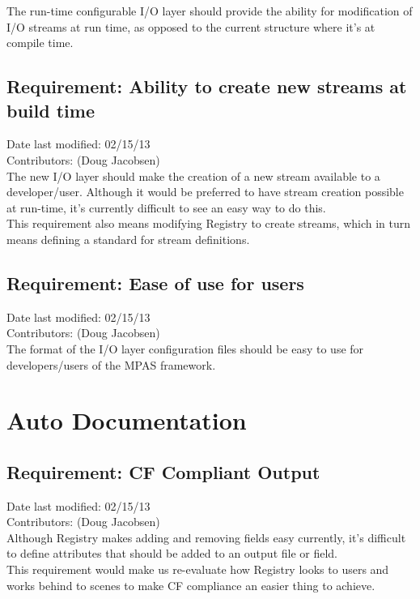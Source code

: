 \documentclass[11pt]{report}
\begin{document}
The run-time configurable I/O layer should provide the ability for modification
of I/O streams at run time, as opposed to the current structure where it's at
compile time.

\subsection{Requirement: Ability to create new streams at build time}
Date last modified: 02/15/13 \\
Contributors: (Doug Jacobsen) \\

The new I/O layer should make the creation of a new stream available to a
developer/user. Although it would be preferred to have stream creation possible
at run-time, it's currently difficult to see an easy way to do this. \\

This requirement also means modifying Registry to create streams, which in turn
means defining a standard for stream definitions.

\subsection{Requirement: Ease of use for users}
Date last modified: 02/15/13 \\
Contributors: (Doug Jacobsen) \\

The format of the I/O layer configuration files should be easy to use for
developers/users of the MPAS framework.

\section{Auto Documentation}

\subsection{Requirement: CF Compliant Output}
Date last modified: 02/15/13 \\
Contributors: (Doug Jacobsen) \\

Although Registry makes adding and removing fields easy currently, it's
difficult to define attributes that should be added to an output file or field. \\

This requirement would make us re-evaluate how Registry looks to users and
works behind to scenes to make CF compliance an easier thing to achieve. \\
\end{document}
